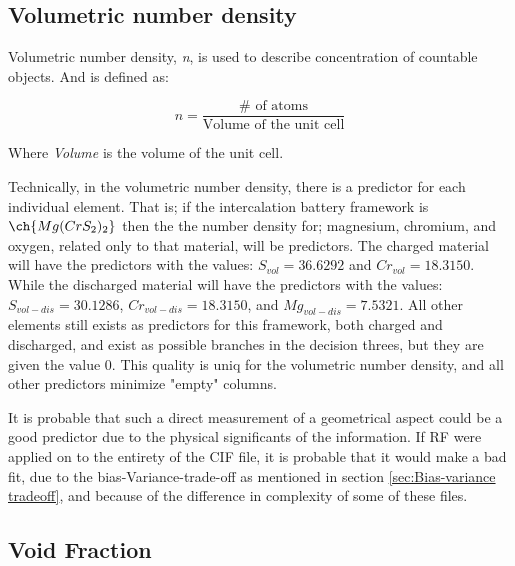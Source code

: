 \subsection{Volumetric number density } \label{sec:volumetric_number_density}

	Volumetric number density, \textit{n}, is used to describe concentration of countable objects. And is defined as: 
	
\begin{equation}\label{eq:n}
n= \frac{\#\text{ of atoms}}{\text{Volume of the unit cell}}
\end{equation}

	Where \textit{Volume} is the volume of the unit cell. 
	
	Technically, in the volumetric number density, there is a predictor for each individual element. That is; if the intercalation battery framework is $\ch{Mg(CrS_2)_2}$ then the the number density for; magnesium, chromium, and oxygen, related only to that material, will be predictors. The charged material will have the predictors with the values: $S_{vol} = 36.6292$ and $Cr_{vol} = 18.3150 $. While the discharged material will have the predictors with the values: $S_{vol-dis} = 30.1286$, $Cr_{vol-dis} =18.3150 $, and $Mg_{vol-dis} = 7.5321$. All other elements still exists as predictors for this framework, both charged and discharged, and exist as possible branches in the decision threes, but they are given the value $0$. This quality is uniq for the volumetric number density, and all other predictors minimize "empty" columns. 

It is probable that such a direct measurement of a geometrical aspect could be a good predictor due to the physical significants of the information. If RF were applied on to the entirety of the CIF file, it is probable that it would make a bad fit, due to the bias-Variance-trade-off as mentioned in section \ref{sec:Bias-variance tradeoff}, and because of the difference in complexity of some of these files. 




\pagebreak
\subsection{Void Fraction} \label{sec:Void_Fraction}

